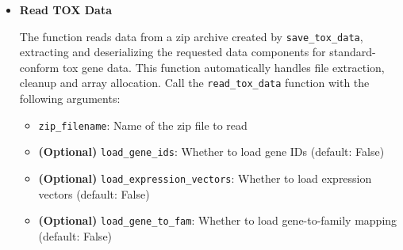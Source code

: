 \documentclass[11pt]{article}
\begin{document}
\begin{enumerate}
\begin{itemize}
\begin{itemize}
	      	      	\item \textbf{(Optional)} \texttt{shift\_vectors}: 2D array of shift
	      	      	      vectors
	      	      	      
	      	      	\item Corresponding \texttt{*\_name} parameters for temporary
	      	      	      filenames (e.g., \texttt{gene\_ids\_name}, \texttt{expression\_vectors\_name},
	      	      	      etc.)
	      	      \end{itemize}
	      	      
	      	      \begin{lstlisting}[language=Python, caption={Python Save TOX Data}]
save_tox_data(zip_filename, gene_ids=None, expression_vectors=None, 
        gene_to_fam=None, family_ids=None, family_centroids=None, 
        shift_vectors=None, gene_ids_name=None, 
        expression_vectors_name=None, gene_to_fam_name=None, 
        family_ids_name=None, family_centroids_name=None, 
        shift_vectors_name=None)
	      	      \end{lstlisting}
	      	      
	      	\item \textbf{Read TOX Data}
	      	      
	      	      The function reads data from a zip archive created by \texttt{save\_tox\_data},
	      	      extracting and deserializing the requested data components for standard-conform
	      	      tox gene data. This function automatically handles file extraction, cleanup
	      	      and array allocation. Call the \texttt{read\_tox\_data} function with the
	      	      following arguments:
	      	      
	      	      \begin{itemize}
	      	      	\item \texttt{zip\_filename}: Name of the zip file to read
	      	      	      
	      	      	\item \textbf{(Optional)} \texttt{load\_gene\_ids}: Whether to load
	      	      	      gene IDs (default: False)
	      	      	      
	      	      	\item \textbf{(Optional)} \texttt{load\_expression\_vectors}:
	      	      	      Whether to load expression vectors (default: False)
	      	      	      
	      	      	\item \textbf{(Optional)} \texttt{load\_gene\_to\_fam}: Whether to
	      	      	      load gene-to-family mapping (default: False)
	      	      	      

\end{itemize}
\end{itemize}
\end{enumerate}
\end{document}
